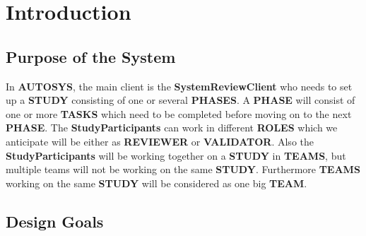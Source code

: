 \section{Introduction}

\subsection{Purpose of the System}
In \textbf{AUTOSYS}, the main client is the \textbf{SystemReviewClient} who needs to set up a \textbf{STUDY} consisting of one or several \textbf{PHASES}. A \textbf{PHASE} will consist of one or more \textbf{TASKS} which need to be completed before moving on to the next \textbf{PHASE}. The \textbf{StudyParticipants} can work in different \textbf{ROLES} which we anticipate will be either as \textbf{REVIEWER} or \textbf{VALIDATOR}. Also the \textbf{StudyParticipants} will be working together on a \textbf{STUDY} in \textbf{TEAMS}, but multiple teams will not be working on the same \textbf{STUDY}. Furthermore \textbf{TEAMS} working on the same \textbf{STUDY} will be considered as one big \textbf{TEAM}.

\subsection{Design Goals}

